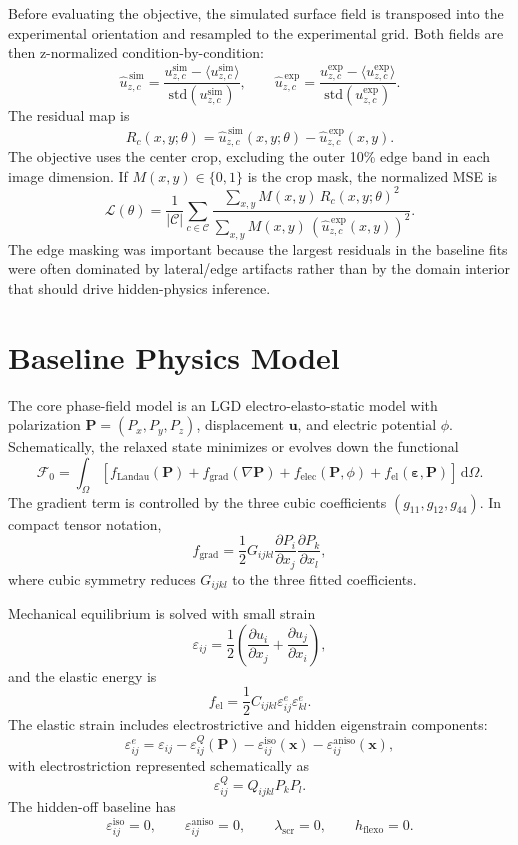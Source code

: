 \documentclass[11pt]{article}
\newcommand{\vect}[1]{\bm{#1}}
\newcommand{\dd}{\mathrm{d}}
\newcommand{\eps}{\varepsilon}
\newcommand{\Uzc}[2]{u_{z,#2}^{#1}}
\begin{document}
Before evaluating the objective, the simulated surface field is transposed into
the experimental orientation and resampled to the experimental grid.  Both
fields are then z-normalized condition-by-condition:
\[
  \widehat{u}_{z,c}^{\,\mathrm{sim}}
  =
  \frac{\Uzc{\mathrm{sim}}{c}-\langle \Uzc{\mathrm{sim}}{c}\rangle}
       {\mathrm{std}(\Uzc{\mathrm{sim}}{c})},
  \qquad
  \widehat{u}_{z,c}^{\,\mathrm{exp}}
  =
  \frac{\Uzc{\mathrm{exp}}{c}-\langle \Uzc{\mathrm{exp}}{c}\rangle}
       {\mathrm{std}(\Uzc{\mathrm{exp}}{c})} .
\]
The residual map is
\[
  R_c(x,y;\theta)
  =
  \widehat{u}_{z,c}^{\,\mathrm{sim}}(x,y;\theta)
  -
  \widehat{u}_{z,c}^{\,\mathrm{exp}}(x,y).
\]
The objective uses the center crop, excluding the outer 10\% edge band in each
image dimension.  If \(M(x,y)\in\{0,1\}\) is the crop mask, the normalized MSE is
\[
  \mathcal{L}(\theta)
  =
  \frac{1}{|\mathcal{C}|}
  \sum_{c\in\mathcal{C}}
  \frac{\sum_{x,y} M(x,y)\,R_c(x,y;\theta)^2}
       {\sum_{x,y} M(x,y)\,
       \left(\widehat{u}_{z,c}^{\,\mathrm{exp}}(x,y)\right)^2}.
\]
The edge masking was important because the largest residuals in the baseline
fits were often dominated by lateral/edge artifacts rather than by the domain
interior that should drive hidden-physics inference.

\section{Baseline Physics Model}

The core phase-field model is an LGD electro-elasto-static model with
polarization \(\vect{P}=(P_x,P_y,P_z)\), displacement \(\vect{u}\), and electric
potential \(\phi\).  Schematically, the relaxed state minimizes or evolves down
the functional
\[
  \mathcal{F}_0
  =
  \int_{\Omega}
  \left[
    f_{\mathrm{Landau}}(\vect{P})
    + f_{\mathrm{grad}}(\nabla \vect{P})
    + f_{\mathrm{elec}}(\vect{P},\phi)
    + f_{\mathrm{el}}(\vect{\eps},\vect{P})
  \right]\,\dd\Omega .
\]
The gradient term is controlled by the three cubic coefficients
\((g_{11},g_{12},g_{44})\).  In compact tensor notation,
\[
  f_{\mathrm{grad}}
  =
  \frac{1}{2}G_{ijkl}
  \frac{\partial P_i}{\partial x_j}
  \frac{\partial P_k}{\partial x_l},
\]
where cubic symmetry reduces \(G_{ijkl}\) to the three fitted coefficients.

Mechanical equilibrium is solved with small strain
\[
  \eps_{ij}
  =
  \frac{1}{2}\left(\frac{\partial u_i}{\partial x_j}
  + \frac{\partial u_j}{\partial x_i}\right),
\]
and the elastic energy is
\[
  f_{\mathrm{el}}
  =
  \frac{1}{2}C_{ijkl}
  \eps^{e}_{ij}\eps^{e}_{kl}.
\]
The elastic strain includes electrostrictive and hidden eigenstrain components:
\[
  \eps^{e}_{ij}
  =
  \eps_{ij}
  - \eps^{Q}_{ij}(\vect{P})
  - \eps^{\mathrm{iso}}_{ij}(\vect{x})
  - \eps^{\mathrm{aniso}}_{ij}(\vect{x}),
\]
with electrostriction represented schematically as
\[
  \eps^{Q}_{ij} = Q_{ijkl}P_kP_l .
\]
The hidden-off baseline has
\[
  \eps^{\mathrm{iso}}_{ij}=0,\qquad
  \eps^{\mathrm{aniso}}_{ij}=0,\qquad
  \lambda_{\mathrm{scr}}=0,\qquad
  h_{\mathrm{flexo}}=0 .
\]
\end{document}
